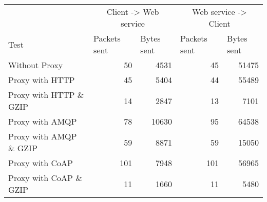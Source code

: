 \begin{tabular}{lrrrr}
\hline
\multicolumn{1}{l}{}                  & \multicolumn{2}{c}{Client -> Web service}                           & \multicolumn{2}{c}{Web service -> Client}                           \\
\multicolumn{1}{l}{Test} & \multicolumn{1}{l}{Packets sent} & \multicolumn{1}{l}{Bytes sent} & \multicolumn{1}{l}{Packets sent} & \multicolumn{1}{l}{Bytes sent} \\ \hline
Without Proxy                   & 50             & 4531           & 45             & 51475          \\
Proxy with HTTP                 & 45             & 5404           & 44             & 55489          \\
Proxy with HTTP \& GZIP         & 14             & 2847           & 13             & 7101           \\
Proxy with AMQP                 & 78             & 10630          & 95             & 64538          \\
Proxy with AMQP \& GZIP         & 59             & 8871           & 59             & 15050          \\
Proxy with CoAP                 & 101            & 7948           & 101            & 56965          \\
Proxy with CoAP \& GZIP         & 11             & 1660           & 11             & 5480           \\
\end{tabular}
